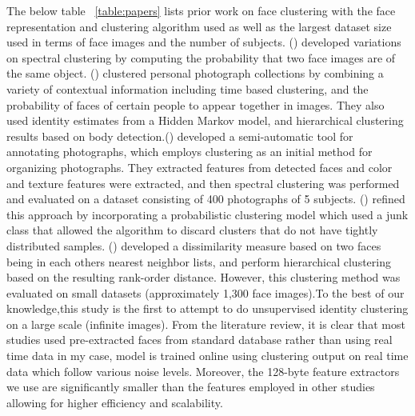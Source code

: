 \documentclass[a4paper,12pt, twoside]{NITKReport}
\begin{document}
\par The below table ~\ref{table:papers} lists prior work on face clustering with the face representation and clustering algorithm used as well as the largest dataset size used in terms of face images and the number of subjects. (\cite{ho2003clustering}) developed variations on spectral clustering by computing the probability that two face images are of the same object. (\cite{zhao2006automatic}) clustered personal photograph collections by combining a variety of contextual information including time based clustering, and the probability of faces of certain people to appear together in images. They also used identity estimates from a  Hidden  Markov  model,  and  hierarchical  clustering results based on body detection.(\cite{cui2007easyalbum}) developed a semi-automatic tool for annotating photographs,  which employs clustering as an initial method for organizing photographs. They extracted features from detected faces and color and texture features were extracted, and then spectral
clustering was performed and evaluated on a dataset consisting of 400 photographs of 5 subjects. (\cite{tian2007face}) refined this approach by incorporating a
probabilistic clustering model which used a junk class that allowed the algorithm to discard clusters that do not have tightly distributed samples. (\cite{zhu2011rank}) developed a dissimilarity measure based on two faces being in each others nearest neighbor lists, and perform hierarchical clustering based on the resulting rank-order distance.  However, this clustering method was evaluated on small datasets (approximately 1,300 face images).To the best of our knowledge,this study is the first to attempt to do unsupervised identity  clustering on a large scale (infinite images). From the literature review, it is  clear that most studies used pre-extracted faces from standard database rather than using real time data in my case, model is trained online using clustering output on real time data which follow various noise levels. Moreover, the 128-byte feature extractors we use are significantly smaller than the features employed  in  other  studies  allowing  for  higher  efficiency and scalability.
\end{document}
